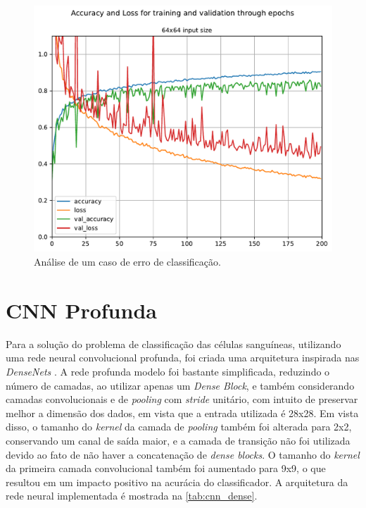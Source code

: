 \begin{figure}[H]
	\centering
	\includegraphics[width=0.75\linewidth]{../../plot/cnn_shallow/64x64_model_training}
	\caption{Análise de um caso de erro de classificação.}
	\label{fig:64x64_model_training}
\end{figure}


\clearpage
\section{CNN Profunda}

Para a solução do problema de classificação das células sanguíneas, utilizando uma rede neural convolucional profunda, foi criada uma arquitetura inspirada nas \textit{DenseNets} \cite{huang2018densely}. A rede profunda modelo foi bastante simplificada, reduzindo o número de camadas, ao utilizar apenas um \textit{Dense Block}, e também considerando camadas convolucionais e de \textit{pooling} com \textit{stride} unitário, com intuito de preservar melhor a dimensão dos dados, em vista que a entrada utilizada é 28x28. Em vista disso, o tamanho do \textit{kernel} da camada de \textit{pooling} também foi alterada para 2x2, conservando um canal de saída maior, e a camada de transição não foi utilizada devido ao fato de não haver a concatenação de \textit{dense blocks}. O tamanho do \textit{kernel} da primeira camada convolucional também foi aumentado para 9x9, o que resultou em um impacto positivo na acurácia do classificador. A arquitetura da rede neural implementada é mostrada na \autoref{tab:cnn_dense}.

